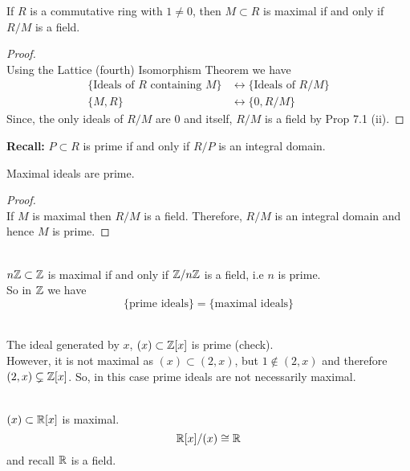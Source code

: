 \documentclass[../Main.tex]{subfiles}
\begin{document}
\begin{thm}[title = \texorpdfstring{$M$}{M} maximal in comm. \texorpdfstring{$R \Longleftrightarrow R/M$}{R iff R/M} is field]
	If $R$ is a commutative ring with $1\ne 0$, then $M\subset R$ is maximal if and only if $R/M$ is a field.
\end{thm}

\begin{proof}~\\
	Using the Lattice (fourth) Isomorphism Theorem  we have
	\begin{align*}
	\{\text{Ideals of } R \text{ containing } M \} &\longleftrightarrow \{\text{Ideals of } R/M\}\\
	\{M,R\} &\longleftrightarrow \{0, R/M\}
	\end{align*}
	Since, the only ideals of $R/M$ are $0$ and itself, $R/M$ is a field by Prop 7.1 (ii).
\end{proof}
\textbf{Recall:} $P\subset R$ is prime if and only if $R/P$ is an integral domain.
\begin{crl}[title= Maximal ideals are prime,label=7.9]
	Maximal ideals are prime.
\end{crl}
\begin{proof}~\\
	If $M$ is maximal then $R/M$ is a field. Therefore, $R/M$ is an integral domain and hence $M$ is prime.
\end{proof}
\begin{example}~\\
	$n\mathbb{Z}\subset \mathbb{Z}$ is maximal if and only if $\mathbb{Z}/n\mathbb{Z}$ is a field, i.e $n$ is prime.\\
	So in $\mathbb{Z}$ we have
	\[\{\text{prime ideals}\} =\{\text{maximal ideals}\} \]
\end{example}
\begin{example}~\\
	The ideal generated by $x$, $(x) \subset \mathbb{Z}[x]$ is prime (check).\\
	However, it is not maximal as $(x) \subset (2,x)$, but $1\notin (2,x)$ and therefore $(2,x) \subsetneq \mathbb{Z}[x]$.
	So, in this case prime ideals are not necessarily maximal.
\end{example}
\begin{example}~\\
	$(x)\subset \mathbb{R}[x]$ is maximal.
	\[\mathbb{R}[x]/(x) \cong \mathbb{R}\]
	and recall $\mathbb{R}$ is a field.
\end{example}
\end{document}

